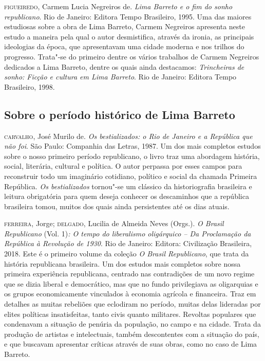 \documentclass{extarticle}
\begin{document}
\textsc{figueiredo}, Carmem Lucia Negreiros de. \emph{Lima Barreto e o fim do
sonho republicano}. Rio de Janeiro: Editora Tempo Brasileiro, 1995. Uma
das maiores estudiosas sobre a obra de Lima Barreto, Carmem Negreiros
apresenta neste estudo a maneira pela qual o autor desmistifica, através
da ironia, as principais ideologias da época, que apresentavam uma
cidade moderna e nos trilhos do progresso. Trata"-se do primeiro dentre
os vários trabalhos de Carmem Negreiros dedicados a Lima Barreto, dentre
os quais ainda destacamos: \emph{Trincheiras de sonho: Ficção e cultura
em Lima Barreto}. Rio de Janeiro: Editora Tempo Brasileiro, 1998.


\subsection{Sobre o período histórico de Lima Barreto}

\textsc{carvalho}, José Murilo de. \emph{Os bestializados: o Rio de Janeiro e a
República que não foi}. São Paulo: Companhia das Letras, 1987. Um dos
mais completos estudos sobre o nosso primeiro período republicano, o
livro traz uma abordagem história, social, literária, cultural e
política. O autor perpassa por esses campos para reconstruir todo um
imaginário cotidiano, político e social da chamada Primeira República.
\emph{Os bestializados} tornou"-se um clássico da historiografia
brasileira e leitura obrigatória para quem deseja conhecer os
descaminhos que a república brasileira tomou, muitos dos quais ainda
persistentes até os dias atuais.

\textsc{ferreira}, Jorge; \textsc{delgado}, Lucilia de Almeida Neves (Orgs.). \emph{O
Brasil Republicano} (Vol. 1)\emph{: O tempo do liberalismo oligárquico
-- Da Proclamação da República à Revolução de 1930}. Rio de Janeiro:
Editora: Civilização Brasileira, 2018. Este é o primeiro volume da
coleção \emph{O Brasil Republicano}, que trata da história republicana
brasileira. Um dos estudos mais completos sobre nossa primeira
experiência republicana, centrado nas contradições de um novo regime que
se dizia liberal e democrático, mas que no fundo privilegiava as
oligarquias e os grupos economicamente vinculados à economia agrícola e
financeira. Traz em detalhes as muitas rebeliões que eclodiram no
período, muitas delas lideradas por elites políticas insatisfeitas,
tanto civis quanto militares. Revoltas populares que condenavam a
situação de penúria da população, no campo e na cidade. Trata da
produção de artistas e intelectuais, também descontentes com a situação
do país, e que buscavam apresentar críticas através de suas obras, como
no caso de Lima Barreto.
\end{document}
